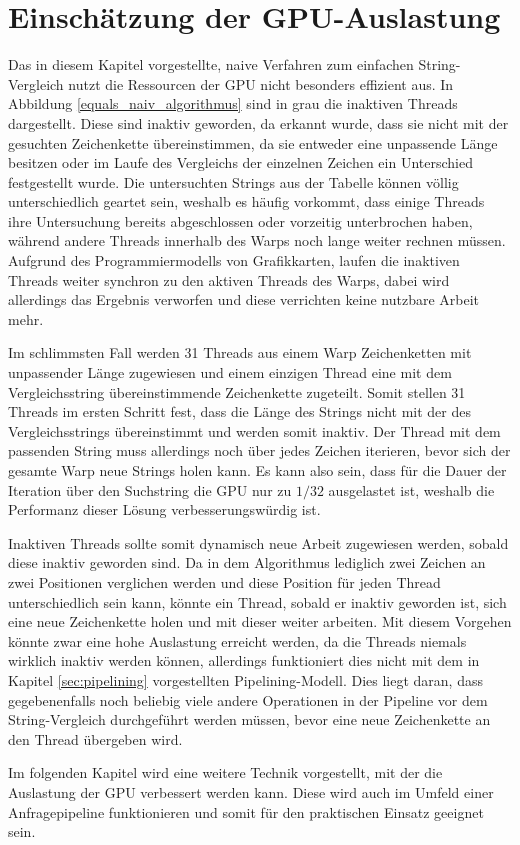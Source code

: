 \section{Einschätzung der GPU-Auslastung}
\label{sec:unterauslastung_problem}

Das in diesem Kapitel vorgestellte, naive Verfahren zum einfachen String-Vergleich nutzt die Ressourcen der GPU nicht besonders effizient aus.
In Abbildung \ref{equals_naiv_algorithmus} sind in grau die inaktiven Threads dargestellt.
Diese sind inaktiv geworden, da erkannt wurde, dass sie nicht mit der gesuchten Zeichenkette übereinstimmen, da sie entweder eine unpassende Länge besitzen oder im Laufe des Vergleichs der einzelnen Zeichen ein Unterschied festgestellt wurde.
Die untersuchten Strings aus der Tabelle können völlig unterschiedlich geartet sein, weshalb es häufig vorkommt, dass einige Threads ihre Untersuchung bereits abgeschlossen oder vorzeitig unterbrochen haben, während andere Threads innerhalb des Warps noch lange weiter rechnen müssen.
Aufgrund des Programmiermodells von Grafikkarten, laufen die inaktiven Threads weiter synchron zu den aktiven Threads des Warps, dabei wird allerdings das Ergebnis verworfen und diese verrichten keine nutzbare Arbeit mehr.

Im schlimmsten Fall werden 31 Threads aus einem Warp Zeichenketten mit unpassender Länge zugewiesen und einem einzigen Thread eine mit dem Vergleichsstring übereinstimmende Zeichenkette zugeteilt.
Somit stellen 31 Threads im ersten Schritt fest, dass die Länge des Strings nicht mit der des Vergleichsstrings übereinstimmt und werden somit inaktiv.
Der Thread mit dem passenden String muss allerdings noch über jedes Zeichen iterieren, bevor sich der gesamte Warp neue Strings holen kann.
Es kann also sein, dass für die Dauer der Iteration über den Suchstring die GPU nur zu $1/32$ ausgelastet ist, weshalb die Performanz dieser Lösung verbesserungswürdig ist.

Inaktiven Threads sollte somit dynamisch neue Arbeit zugewiesen werden, sobald diese inaktiv geworden sind.
Da in dem Algorithmus lediglich zwei Zeichen an zwei Positionen verglichen werden und diese Position für jeden Thread unterschiedlich sein kann, könnte ein Thread, sobald er inaktiv geworden ist, sich eine neue Zeichenkette holen und mit dieser weiter arbeiten.
Mit diesem Vorgehen könnte zwar eine hohe Auslastung erreicht werden, da die Threads niemals wirklich inaktiv werden können, allerdings funktioniert dies nicht mit dem in Kapitel \ref{sec:pipelining} vorgestellten Pipelining-Modell.
Dies liegt daran, dass gegebenenfalls noch beliebig viele andere Operationen in der Pipeline vor dem String-Vergleich durchgeführt werden müssen, bevor eine neue Zeichenkette an den Thread übergeben wird.

Im folgenden Kapitel wird eine weitere Technik vorgestellt, mit der die Auslastung der GPU verbessert werden kann.
Diese wird auch im Umfeld einer Anfragepipeline funktionieren und somit für den praktischen Einsatz geeignet sein.